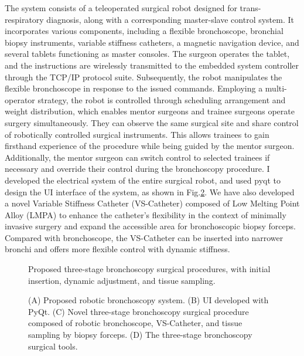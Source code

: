 \documentclass[
    ngerman,american
    ]{scrartcl}
\begin{document}
The system consists of a teleoperated surgical robot designed for trans-respiratory diagnosis, along with a corresponding master-slave control system. It incorporates various components, including a flexible bronchoscope, bronchial biopsy instruments, variable stiffness catheters, a magnetic navigation device, and several tablets functioning as master consoles. The surgeon operates the tablet, and the instructions are wirelessly transmitted to the embedded system controller through the TCP/IP protocol suite. Subsequently, the robot manipulates the flexible bronchoscope in response to the issued commands. Employing a multi-operator strategy, the robot is controlled through scheduling arrangement and weight distribution, which enables mentor surgeons and trainee surgeons operate surgery simultaneously. They can observe the same surgical site and share control of robotically controlled surgical instruments. This allows trainees to gain firsthand experience of the procedure while being guided by the mentor surgeon. Additionally, the mentor surgeon can switch control to selected trainees if necessary and override their control during the bronchoscopy procedure. I developed the electrical system of the entire surgical robot, and used pyqt to design the UI interface of the system, as shown in Fig.\ref{three_tools}. We have also developed a novel Variable Stiffness Catheter (VS-Catheter) composed of Low Melting Point Alloy (LMPA) to enhance the catheter's flexibility in the context of minimally invasive surgery and expand the accessible area for bronchoscopic biopsy forceps. Compared with bronchoscope, the VS-Catheter can be inserted into narrower bronchi and offers more flexible control with dynamic stiffness.   

\begin{figure}[H]
	\caption{Proposed three-stage bronchoscopy surgical procedures, with initial insertion, dynamic adjustment, and tissue sampling.}
	\label{three_stage}
\end{figure}


\begin{figure}[H]
	\caption{(A) Proposed robotic bronchoscopy system. (B) UI developed with PyQt. (C) Novel three-stage bronchoscopy surgical procedure composed of robotic bronchoscope, VS-Catheter, and tissue sampling by biopsy forceps. (D) The three-stage bronchoscopy surgical tools.}
	\label{three_tools}
\end{figure}
\end{document}
